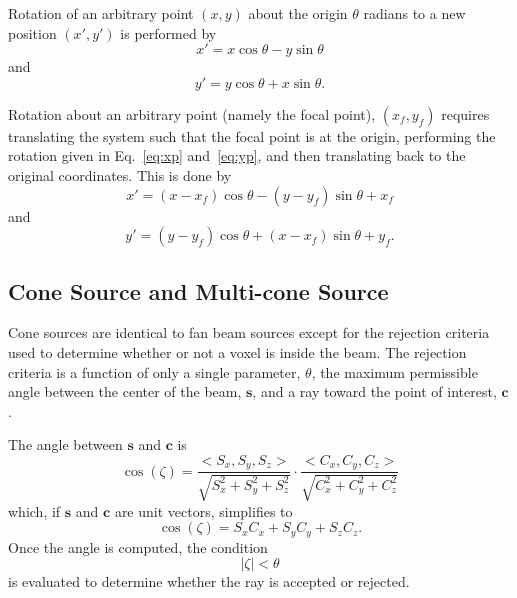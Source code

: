 Rotation of an arbitrary point $(x,y)$ about the origin $\theta$ radians to a new position $(x', y')$ is performed by
\begin{equation}\label{eq:xp}
x' = x \cos \theta - y \sin \theta
\end{equation}
and
\begin{equation}\label{eq:yp}
y' = y \cos \theta + x \sin \theta.
\end{equation}

Rotation about an arbitrary point (namely the focal point), $(x_f, y_f)$ requires translating the system such that the focal point is at the origin, performing the rotation given in Eq.~\ref{eq:xp} and~\ref{eq:yp}, and then translating back to the original coordinates. This is done by
\begin{equation}\label{eq:xp2}
x' = (x-x_f) \cos \theta - (y-y_f) \sin \theta + x_f
\end{equation}
and
\begin{equation}\label{eq:yp2}
y' = (y - y_f) \cos \theta + (x - x_f) \sin \theta + y_f.
\end{equation}

\subsection{Cone Source and Multi-cone Source}
Cone sources are identical to fan beam sources except for the rejection criteria used to determine whether or not a voxel is inside the beam. The rejection criteria is a function of only a single parameter, $\theta$, the maximum permissible angle between the center of the beam, $\boldsymbol{s}$, and a ray toward the point of interest, $\boldsymbol{c}$.

The angle between $\boldsymbol{s}$ and $\boldsymbol{c}$ is
\begin{equation}\label{eq:zetacos}
\cos(\zeta) = \frac{<S_x, S_y, S_z>}{\sqrt{S_x^2 + S_y^2 + S_z^2}} \cdot \frac{<C_x, C_y, C_z>}{\sqrt{C_x^2 + C_y^2 + C_z^2}}
\end{equation}
which, if $\boldsymbol{s}$ and $\boldsymbol{c}$ are unit vectors, simplifies to
\begin{equation}\label{eq:zetacos}
\cos(\zeta) = S_x C_x + S_y C_y + S_z C_z.
\end{equation}
Once the angle is computed, the condition
\begin{equation}\label{eq:zetacon}
|\zeta| < \theta
\end{equation}
is evaluated to determine whether the ray is accepted or rejected.

